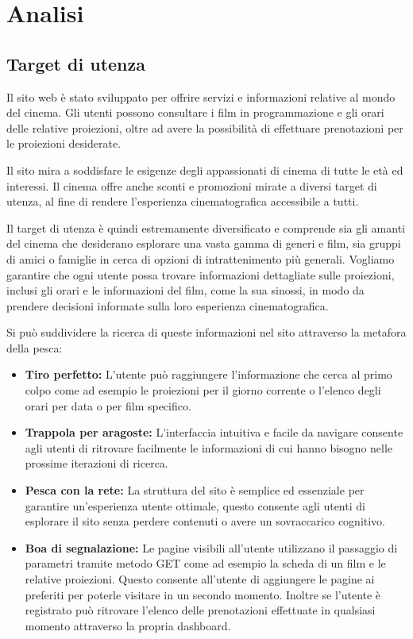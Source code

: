 \section{Analisi}
\subsection{Target di utenza}

Il sito web è stato sviluppato per offrire servizi e informazioni relative al mondo del cinema. Gli utenti possono consultare i film in programmazione e gli orari delle relative proiezioni, oltre ad avere la possibilità di effettuare prenotazioni per le proiezioni desiderate.

Il sito mira a soddisfare le esigenze degli appassionati di cinema di tutte le età ed interessi. Il cinema offre anche sconti e promozioni mirate a diversi target di utenza, al fine di rendere l'esperienza cinematografica accessibile a tutti.

Il target di utenza è quindi estremamente diversificato e comprende sia gli amanti del cinema che desiderano esplorare una vasta gamma di generi e film, sia gruppi di amici o famiglie in cerca di opzioni di intrattenimento più generali. Vogliamo garantire che ogni utente possa trovare informazioni dettagliate sulle proiezioni, inclusi gli orari e le informazioni del film, come la sua sinossi, in modo da prendere decisioni informate sulla loro esperienza cinematografica.

Si può suddividere la ricerca di queste informazioni nel sito attraverso la metafora della pesca:
\begin{itemize}
    \item \textbf{Tiro perfetto:} L'utente può raggiungere l'informazione che cerca al primo colpo come ad esempio le proiezioni per il giorno corrente o l'elenco degli orari per data o per film specifico.
    \item \textbf{Trappola per aragoste:} L'interfaccia intuitiva e facile da navigare consente agli utenti di ritrovare facilmente le informazioni di cui hanno bisogno nelle prossime iterazioni di ricerca. 
    \item \textbf{Pesca con la rete:} La struttura del sito è semplice ed essenziale per garantire un'esperienza utente ottimale, questo consente agli utenti di esplorare il sito senza perdere contenuti o avere un sovraccarico cognitivo.
    \item \textbf{Boa di segnalazione:} Le pagine visibili all'utente utilizzano il passaggio di parametri tramite metodo GET come ad esempio la scheda di un film e le relative proiezioni. Questo consente all'utente di aggiungere le pagine ai preferiti per poterle visitare in un secondo momento. Inoltre se l'utente è registrato può ritrovare l'elenco delle prenotazioni effettuate in qualsiasi momento attraverso la propria dashboard.
\end{itemize}

